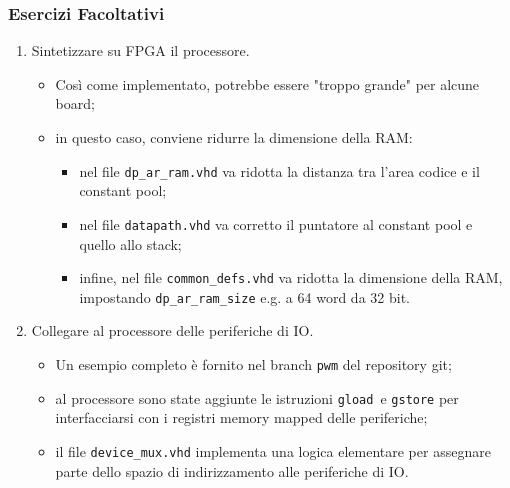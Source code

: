 \documentclass{beamer}
\begin{document}
\begin{frame}
  \frametitle{Esercizi \textbf{Facoltativi}}
  \begin{enumerate}
    \item Sintetizzare su FPGA il processore.
    \begin{itemize}
      \item Così come implementato, potrebbe essere "troppo grande" per
      alcune board;
      \item in questo caso, conviene ridurre la dimensione della RAM:
      \begin{itemize}
        \item nel file \lstinline{dp_ar_ram.vhd} va ridotta la distanza tra
        l'area codice e il constant pool;
        \item nel file \lstinline{datapath.vhd} va corretto il puntatore al
        constant pool e quello allo stack;
        \item infine, nel file \lstinline{common_defs.vhd} va ridotta la
        dimensione della RAM, impostando \lstinline{dp_ar_ram_size} e.g. a
        64 word da 32 bit.
      \end{itemize}
    \end{itemize}
    \item Collegare al processore delle periferiche di IO.
    \begin{itemize}
      \item Un esempio completo è fornito nel branch \lstinline{pwm} del
      repository git;
      \item al processore sono state aggiunte le istruzioni \lstinline{gload} e
      \lstinline{gstore} per interfacciarsi con i registri memory mapped delle
      periferiche;
      \item il file \lstinline{device_mux.vhd} implementa una logica elementare
      per assegnare parte dello spazio di indirizzamento alle periferiche di IO.
    \end{itemize}
  \end{enumerate}
\end{frame}
\end{document}
